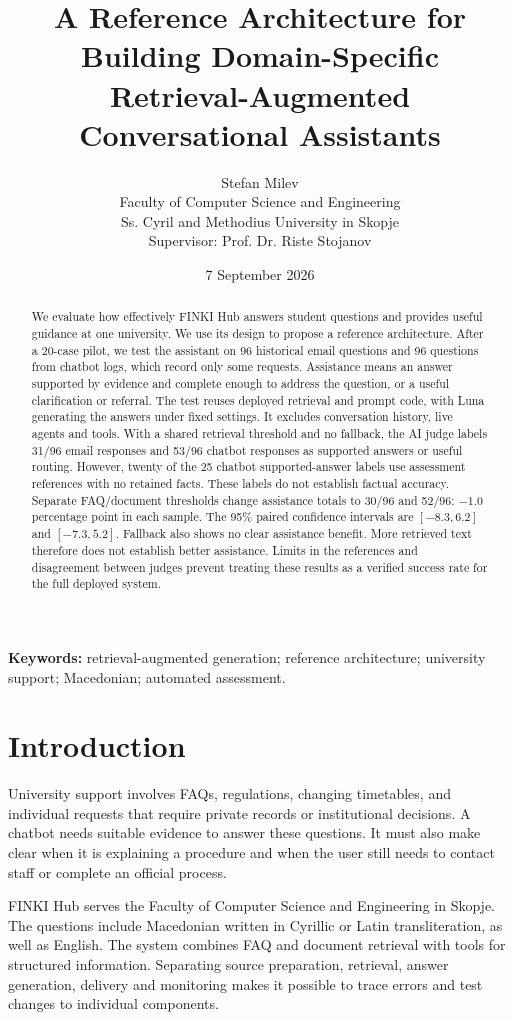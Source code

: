 \documentclass[a4paper,10pt,twocolumn]{article}
\title{A Reference Architecture for Building Domain-Specific Retrieval-Augmented Conversational Assistants}
\author{Stefan Milev\\\small Faculty of Computer Science and Engineering\\\small Ss. Cyril and Methodius University in Skopje\\\small Supervisor: Prof. Dr. Riste Stojanov}
\date{7 September 2026}
\begin{document}
\maketitle
\begin{abstract}
We evaluate how effectively FINKI Hub answers student questions and provides useful guidance at one university. We use its design to propose a reference architecture. After a 20-case pilot, we test the assistant on 96 historical email questions and 96 questions from chatbot logs, which record only some requests. Assistance means an answer supported by evidence and complete enough to address the question, or a useful clarification or referral. The test reuses deployed retrieval and prompt code, with Luna generating the answers under fixed settings. It excludes conversation history, live agents and tools. With a shared retrieval threshold and no fallback, the AI judge labels 31/96 email responses and 53/96 chatbot responses as supported answers or useful routing. However, twenty of the 25 chatbot supported-answer labels use assessment references with no retained facts. These labels do not establish factual accuracy. Separate FAQ/document thresholds change assistance totals to 30/96 and 52/96: $-1.0$ percentage point in each sample. The 95\% paired confidence intervals are $[-8.3,6.2]$ and $[-7.3,5.2]$. Fallback also shows no clear assistance benefit. More retrieved text therefore does not establish better assistance. Limits in the references and disagreement between judges prevent treating these results as a verified success rate for the full deployed system.
\end{abstract}
\par\noindent\textbf{Keywords:} retrieval-augmented generation; reference architecture; university support; Macedonian; automated assessment.

\section{Introduction}
University support involves FAQs, regulations, changing timetables, and individual requests that require private records or institutional decisions. A chatbot needs suitable evidence to answer these questions. It must also make clear when it is explaining a procedure and when the user still needs to contact staff or complete an official process.

FINKI Hub serves the Faculty of Computer Science and Engineering in Skopje. The questions include Macedonian written in Cyrillic or Latin transliteration, as well as English. The system combines FAQ and document retrieval with tools for structured information. Separating source preparation, retrieval, answer generation, delivery and monitoring makes it possible to trace errors and test changes to individual components.
\end{document}
